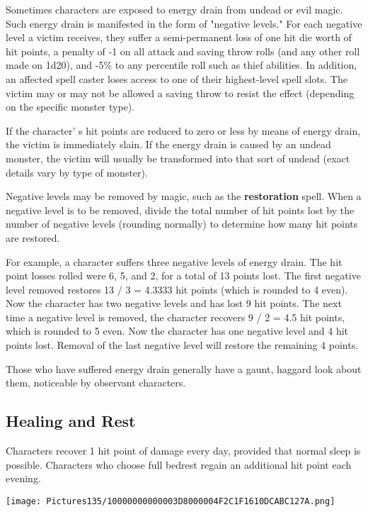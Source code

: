 \documentclass[a4paper,twoside,openany,10pt]{book}
\begin{document}
\begin{multicols}{2}
Sometimes characters are exposed to energy drain from undead or evil magic. Such energy drain is manifested in the form of "negative levels." For each negative level a victim receives, they suffer a semi-permanent loss of one hit die worth of hit points, a penalty of -1 on all attack and saving throw rolls (and any other roll made on 1d20), and -5\% to any percentile roll such as thief abilities. In addition, an affected spell caster loses access to one of their highest-level spell slots. The victim may or may not be allowed a saving throw to resist the effect (depending on the specific monster type).

If the character' s hit points are reduced to zero or less by means of energy drain, the victim is immediately slain. If the energy drain is caused by an undead monster, the victim will usually be transformed into that sort of undead (exact details vary by type of monster).

Negative levels may be removed by magic, such as the \textbf{restoration} spell. When a negative level is to be removed, divide the total number of hit points lost by the number of negative levels (rounding normally) to determine how many hit points are restored.

For example, a character suffers three negative levels of energy drain. The hit point losses rolled were 6, 5, and 2, for a total of 13 points lost. The first negative level removed restores 13 / 3 = 4.3333 hit points (which is rounded to 4 even). Now the character has two negative levels and has lost 9 hit points. The next time a negative level is removed, the character recovers 9 / 2 = 4.5 hit points, which is rounded to 5 even. Now the character has one negative level and 4 hit points lost. Removal of the last negative level will restore the remaining 4 points.

Those who have suffered energy drain generally have a gaunt, haggard look about them, noticeable by observant characters.

\subsection{Healing and Rest}\label{healing-and-rest}

Characters recover 1 hit point of damage every day, provided that normal sleep is possible. Characters who choose full bedrest regain an additional hit point each evening.

\begin{flushleft}
	\texttt{[image: Pictures135/10000000000003D8000004F2C1F1610DCABC127A.png]}
\end{flushleft}



\end{multicols}
\end{document}

